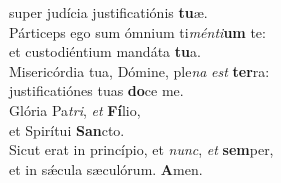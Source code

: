 \evenverse super judícia justificatiónis \textbf{tu}æ.\\
\oddverse Párticeps ego sum ómnium ti\textit{mén}\textit{ti}\textbf{um} te:~\*\\
\oddverse et custodiéntium mandáta \textbf{tu}a.\\
\evenverse Misericórdia tua, Dómine, ple\textit{na} \textit{est} \textbf{ter}ra:~\*\\
\evenverse justificatiónes tuas \textbf{do}ce me.\\
\oddverse Glória Pa\textit{tri}, \textit{et} \textbf{Fí}lio,~\*\\
\oddverse et Spirítui \textbf{San}cto.\\
\evenverse Sicut erat in princípio, et \textit{nunc}, \textit{et} \textbf{sem}per,~\*\\
\evenverse et in sǽcula sæculórum. \textbf{A}men.\\

